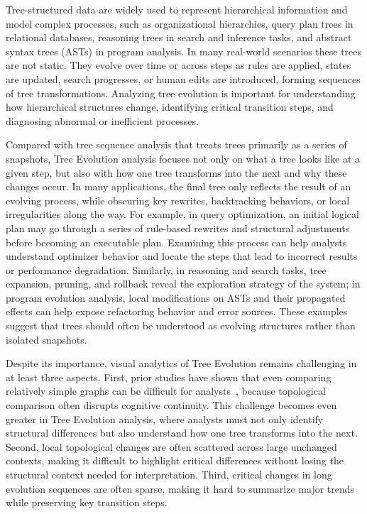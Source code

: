 
\maketitle

Tree-structured data are widely used to represent hierarchical information and model complex processes, such as organizational hierarchies, query plan trees in relational databases, reasoning trees in search and inference tasks, and abstract syntax trees (ASTs) in program analysis. In many real-world scenarios these trees are not static. They evolve over time or across steps as rules are applied, states are updated, search progresses, or human edits are introduced, forming sequences of tree transformations. Analyzing tree evolution is important for understanding how hierarchical structures change, identifying critical transition steps, and diagnosing abnormal or inefficient processes.

Compared with tree sequence analysis that treats trees primarily as a series of snapshots, Tree Evolution analysis focuses not only on what a tree looks like at a given step, but also with how one tree transforms into the next and why these changes occur. In many applications, the final tree only reflects the result of an evolving process, while obscuring key rewrites, backtracking behaviors, or local irregularities along the way. For example, in query optimization, an initial logical plan may go through a series of rule-based rewrites and structural adjustments before becoming an executable plan. Examining this process can help analysts understand optimizer behavior and locate the steps that lead to incorrect results or performance degradation. Similarly, in reasoning and search tasks, tree expansion, pruning, and rollback reveal the exploration strategy of the system; in program evolution analysis, local modifications on ASTs and their propagated effects can help expose refactoring behavior and error sources. These examples suggest that trees should often be understood as evolving structures rather than isolated snapshots.

Despite its importance, visual analytics of Tree Evolution remains challenging in at least three aspects. First, prior studies have shown that even comparing relatively simple graphs can be difficult for analysts~\cite{}, because topological comparison often disrupts cognitive continuity. This challenge becomes even greater in Tree Evolution analysis, where analysts must not only identify structural differences but also understand how one tree transforms into the next. Second, local topological changes are often scattered across large unchanged contexts, making it difficult to highlight critical differences without losing the structural context needed for interpretation. Third, critical changes in long evolution sequences are often sparse, making it hard to summarize major trends while preserving key transition steps. 

